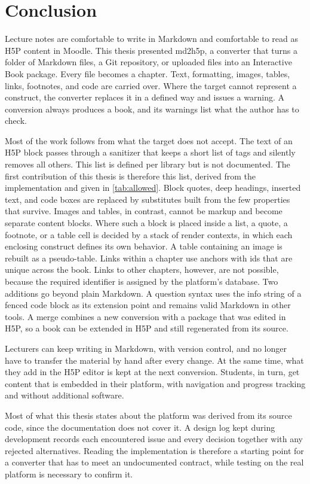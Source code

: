 \section{Conclusion}
\label{sec:conclusions}

Lecture notes are comfortable to write in Markdown and comfortable to read as H5P content in Moodle.
This thesis presented md2h5p, a converter that turns a folder of Markdown files, a Git
repository, or uploaded files into an Interactive Book package.
Every file becomes a chapter. Text, formatting, images, tables, links, footnotes, and code are
carried over.
Where the target cannot represent a construct, the converter replaces it in a defined way and issues
a warning.
A conversion always produces a book, and its warnings list what the author has to check.

Most of the work follows from what the target does not accept.
The text of an H5P block passes through a sanitizer that keeps a short list of tags and silently removes all
others.
This list is defined per library but is not documented.
The first contribution of this thesis is therefore this list, derived from the implementation and given in
\autoref{tab:allowed}.
Block quotes, deep headings, inserted text, and code boxes are replaced by substitutes built from the
few properties that survive.
Images and tables, in contrast, cannot be markup and become separate content blocks.
Where such a block is placed inside a list, a quote, a footnote, or a table cell is decided by a stack
of render contexts, in which each enclosing construct defines its own behavior.
A table containing an image is rebuilt as a pseudo-table.
Links within a chapter use anchors with ids that are unique across the book.
Links to other chapters, however, are not possible, because the required identifier is assigned by the
platform's database.
Two additions go beyond plain Markdown.
A question syntax uses the info string of a fenced code block as its extension point and remains
valid Markdown in other tools.
A merge combines a new conversion with a package that was edited in H5P, so a book can be extended in H5P
and still regenerated from its source.

Lecturers can keep writing in Markdown, with version control, and no longer have to transfer the
material by hand after every change.
At the same time, what they add in the H5P editor is kept at the next conversion.
Students, in turn, get content that is embedded in their platform, with navigation and progress tracking and
without additional software.

Most of what this thesis states about the platform was derived from its source code, since the
documentation does not cover it.
A design log kept during development records each encountered issue and every decision together with
any rejected alternatives.
Reading the implementation is therefore a starting point for a converter that has to meet an
undocumented contract, while testing on the real platform is necessary to confirm it.
